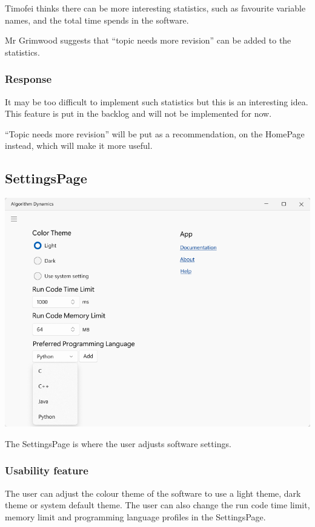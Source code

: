 \documentclass[a4paper]{report}
\begin{document}
Timofei thinks there can be more interesting statistics, such as favourite variable names, and the total time spends in the software.

Mr Grimwood suggests that ``topic needs more revision'' can be added to the statistics.

\subsubsection{Response}
It may be too difficult to implement such statistics but this is an interesting idea. This feature is put in the backlog and will not be implemented for now.

``Topic needs more revision'' will be put as a recommendation, on the HomePage instead, which will make it more useful.

\subsection{SettingsPage}

\includegraphics[width=\textwidth, height=\textheight, keepaspectratio]{SettingsPage-design}

The SettingsPage is where the user adjusts software settings.

\subsubsection{Usability feature}

The user can adjust the colour theme of the software to use a light theme, dark theme or system default theme. The user can also change the run code time limit, memory limit and programming language profiles in the SettingsPage.
\end{document}
